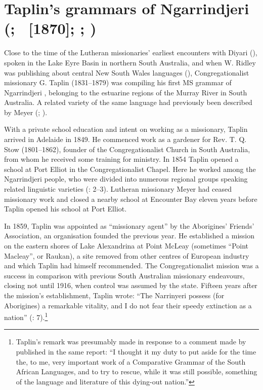 \section{Taplin’s grammars of Ngarrindjeri (\citeyear{taplin_vocabulary_1867}; \citeyear{taplin_notes_1872}~[1870]; \citeyear{taplin_narrinyeri_1874}; \citeyear{taplin_grammar_1878})}
\label{sec:key:7.3}\label{bkm:Ref74069502}\label{bkm:Ref389146214}\label{bkm:Ref389145322}\label{bkm:Ref514608340}\label{bkm:Ref514608058}\label{bkm:Ref514607800}\label{bkm:Ref514606937}\label{bkm:Ref514606622}\label{bkm:Ref514606594}\label{bkm:Ref514605178}

Close to the time of the Lutheran missionaries' earliest encounters with Diyari (), spoken in the Lake Eyre Basin in northern South Australia, and when W. Ridley was publishing about central New South Wales languages (), Congregationalist missionary G. Taplin (1831--1879) was compiling his first MS grammar of Ngarrindjeri \citep{taplin_vocabulary_1867}, belonging to the estuarine regions of the Murray River in South Australia. A related variety of the same language had previously been described by Meyer (\citealt{meyer_vocabulary_1843}; ).

With a private school education and intent on working as a missionary, Taplin arrived in Adelaide in 1849. He commenced work as a gardener for Rev. T. Q. Stow (1801--1862), founder of the Congregationalist Church in South Australia, from whom he received some training for ministry. In {1854} Taplin opened a school at Port Elliot in the Congregationalist Chapel. Here he worked among the Ngarrindjeri people, who were divided into numerous regional groups speaking related linguistic varieties (\citealt{yallop_narinjari_1975}: 2--3). Lutheran missionary Meyer had ceased missionary work and closed a nearby school at Encounter Bay eleven years before Taplin opened his school at Port Elliot.

\hspace*{-.8pt}In 1859, Taplin was appointed as “missionary agent” by the Aborigines' Friends' Association, an organisation founded the previous year. He established a mission on the eastern shores of Lake Alexandrina at Point McLeay (sometimes ``Point Macleay'', or Raukan), a site removed from other centres of European industry and which Taplin had himself recommended. The Congregationalist mission was a success in comparison with previous South Australian missionary endeavours, closing not until 1916, when control was assumed by the state. Fifteen years after the mission’s establishment, Taplin wrote: “The Narrinyeri possess (for Aborigines) a remarkable vitality, and I do not fear their speedy extinction as a nation” (\citeyear{taplin_taplin_1874}: 7).\footnote{Taplin’s remark was presumably made in response to a comment made by \citet[6]{bleek_inquiries_1874} published in the same report:  ``I thought it my duty to put aside for the time the, to me, very important work of a Comparative Grammar of the South African Languages, and to try to rescue, while it was still possible, something of the language and literature of this dying-out nation.''}

